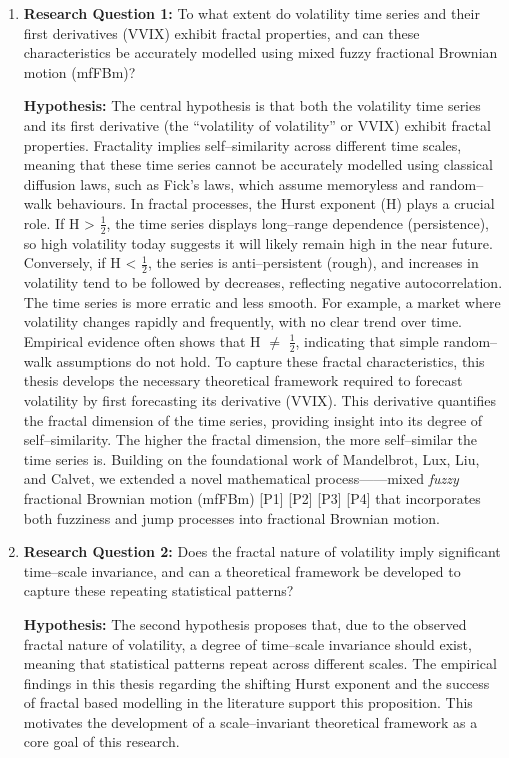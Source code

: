 \documentclass[12pt,a4paper]{report}
\numberwithin{equation}{section}
\begin{document}
\begin{enumerate}
\def\labelenumi{\roman{enumi}.}

\item \textbf{Research Question 1:} To what extent do volatility time series and their first derivatives (VVIX) exhibit fractal properties, and can these characteristics be accurately modelled using mixed fuzzy fractional Brownian motion (mfFBm)?

\textbf{Hypothesis:} The central hypothesis is that both the volatility time series and its first derivative (the ``volatility of volatility'' or VVIX) exhibit fractal properties. Fractality implies self--similarity across different time scales, meaning that these time series cannot be accurately modelled using classical diffusion laws, such as Fick's laws, which assume memoryless and random--walk behaviours. In fractal processes, the Hurst exponent (H) plays a crucial role. If H \textgreater{} $\frac{1}{2}$, the time series displays long--range dependence (persistence), so high volatility today suggests it will likely remain high in the near future. Conversely, if H \textless{} $\frac{1}{2}$, the series is anti--persistent (rough), and increases in volatility tend to be followed by decreases, reflecting negative autocorrelation. The time series is more erratic and less smooth. For example, a market where volatility changes rapidly and frequently, with no clear trend over time. Empirical evidence often shows that H $\neq$ $\frac{1}{2}$, indicating that simple random--walk assumptions do not hold. To capture these fractal characteristics, this thesis develops the necessary theoretical framework required to forecast volatility by first forecasting its derivative (VVIX). This derivative quantifies the fractal dimension of the time series, providing insight into its degree of self--similarity. The higher the fractal dimension, the more self--similar the time series is. Building on the foundational work of Mandelbrot, Lux, Liu, and Calvet, we extended a novel mathematical process------mixed \emph{fuzzy} fractional Brownian motion (mfFBm) [P1] [P2] [P3] [P4] that incorporates both fuzziness and jump processes into fractional Brownian motion.

\item \textbf{Research Question 2:} Does the fractal nature of volatility imply significant time--scale invariance, and can a theoretical framework be developed to capture these repeating statistical patterns?

\textbf{Hypothesis:} The second hypothesis proposes that, due to the observed fractal nature of volatility, a degree of time--scale invariance should exist, meaning that statistical patterns repeat across different scales. The empirical findings in this thesis regarding the shifting Hurst exponent and the success of fractal based modelling in the literature support this proposition. This motivates the development of a scale--invariant theoretical framework as a core goal of this research.


\end{enumerate}
\end{document}
